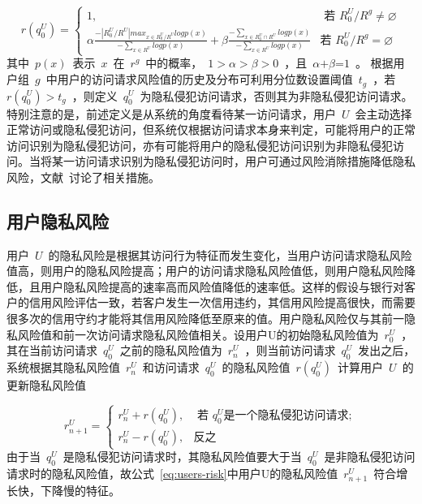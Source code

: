 \begin{equation}
r(q_{0}^{U})=\begin{cases}
1, & \text{ 若 } R_{0}^{U}/{{R}^{g}}\ne \varnothing \\ 
\alpha \frac{-|R_{0}^{U}/{R}^{U}|max_{x\in R_{0}^{U}/{R}^{U}}logp(x)}{-\sum_{x\in{R^U}}logp(x)}+ \beta \frac{-\sum_{x\in R_0^U \cap  R^U}logp(x)}{-\sum_{x\in  R^U}logp(x)}& \text{若 } R_{0}^{U}/{{R}^{g}}=\varnothing 
\end{cases}
\end{equation}
其中~$p(x)$~表示~$x$~在~$r_{{}}^{g}$~中的概率，~$1>\alpha >\beta >0$~，且~$\alpha \text{+}\beta \text{=}1$~。
根据用户组~$g$~中用户的访问请求风险值的历史及分布可利用分位数设置阈值~${{t}_{g}}$~，若~$r(q_{0}^{U})>{{t}_{g}}$~，则定义~$q_{0}^{U}$~为隐私侵犯访问请求，否则其为非隐私侵犯访问请求。特别注意的是，前述定义是从系统的角度看待某一访问请求，用户~$U$~会主动选择正常访问或隐私侵犯访问，但系统仅根据访问请求本身来判定，可能将用户的正常访问识别为隐私侵犯访问，亦有可能将用户的隐私侵犯访问识别为非隐私侵犯访问。当将某一访问请求识别为隐私侵犯访问时，用户可通过风险消除措施降低隐私风险，文献~\cite{diaz-lopez2016dynamic}讨论了相关措施。

\subsection{用户隐私风险}
用户~$U$~的隐私风险是根据其访问行为特征而发生变化，当用户访问请求隐私风险值高，则用户的隐私风险提高；用户的访问请求隐私风险值低，则用户隐私风险降低，且用户隐私风险提高的速率高而风险值降低的速率低。这样的假设与银行对客户的信用风险评估一致，若客户发生一次信用违约，其信用风险提高很快，而需要很多次的信用守约才能将其信用风险降低至原来的值。用户隐私风险仅与其前一隐私风险值和前一次访问请求隐私风险值相关。设用户U的初始隐私风险值为~$r_{0}^{U}$~，其在当前访问请求~$q_{0}^{U}$~之前的隐私风险值为~$r_{n}^{U}$~，则当前访问请求~$q_{0}^{U}$~发出之后，系统根据其隐私风险值~$r_{n}^{U}$~和访问请求~$q_{0}^{U}$~的隐私风险值~$r(q_{0}^{U})$~计算用户~$U$~的更新隐私风险值

\begin{equation}\label{eq:users-risk}
r_{n+1}^{U}=\begin{cases}
r_{n}^{U}+r(q_0^U), & \text{ 若 } q_0^U \text{是一个隐私侵犯访问请求}; \\ 
r_{n}^{U}-r(q_0^U),& \text{反之}
\end{cases}
\end{equation} 
由于当~$q_{0}^{U}$~是隐私侵犯访问请求时，其隐私风险值要大于当~$q_{0}^{U}$~是非隐私侵犯访问请求时的隐私风险值，故公式~\ref{eq:users-risk}中用户U的隐私风险值~$r_{n+1}^{U}$~符合增长快，下降慢的特征。

